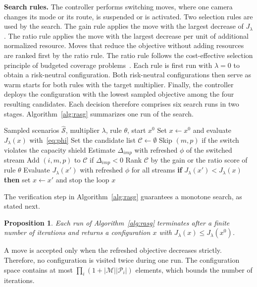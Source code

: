 \documentclass[letterpaper,journal]{IEEEtran}
\newtheorem{proposition}{Proposition}
\begin{document}
\textbf{Search rules.} The controller performs switching moves, where one camera changes its mode or its route, is suspended or is activated. Two selection rules are used by the search. The gain rule applies the move with the largest decrease of $J_\lambda$. The ratio rule applies the move with the largest decrease per unit of additional normalized resource. Moves that reduce the objective without adding resources are ranked first by the ratio rule. The ratio rule follows the cost-effective selection principle of budgeted coverage problems~\cite{khuller1999budgeted,leskovec2007cost}. Each rule is first run with $\lambda=0$ to obtain a risk-neutral configuration. Both risk-neutral configurations then serve as warm starts for both rules with the target multiplier. Finally, the controller deploys the configuration with the lowest sampled objective among the four resulting candidates. Each decision therefore comprises six search runs in two stages. Algorithm~\ref{alg:rasg} summarizes one run of the search.

\begin{algorithm}[t]
\caption{One search run of the RAS-G controller}
\label{alg:rasg}
\small
\begin{algorithmic}[1]
\Require Sampled scenarios $\hat{\mathcal S}$, multiplier $\lambda$, rule $\theta$, start $x^0$
\State Set $x\gets x^0$ and evaluate $J_\lambda(x)$ with~\eqref{eq:phi}
\Repeat
\State Set the candidate list $\mathcal C\gets\emptyset$
\State Skip $(m,p)$ if the switch violates the capacity shield
\State Estimate $\Delta_{imp}$ with refreshed $\phi$ of the switched stream
\State Add $(i,m,p)$ to $\mathcal C$ if $\Delta_{imp}<0$
\EndFor
\State Rank $\mathcal C$ by the gain or the ratio score of rule $\theta$
\State Evaluate $J_\lambda(x')$ with refreshed $\phi$ for all streams
\State \textbf{if} $J_\lambda(x')<J_\lambda(x)$ \textbf{then} set $x\gets x'$ and stop the loop
\EndFor
{}
\State \Return $x$
\end{algorithmic}
\end{algorithm}

The verification step in Algorithm~\ref{alg:rasg} guarantees a monotone search, as stated next.

\begin{proposition}\label{prop:term}
Each run of Algorithm~\ref{alg:rasg} terminates after a finite number of iterations and returns a configuration $x$ with $J_\lambda(x)\le J_\lambda(x^0)$.
\end{proposition}
\begin{IEEEproof}
A move is accepted only when the refreshed objective decreases strictly. Therefore, no configuration is visited twice during one run. The configuration space contains at most $\prod_i(1+|\mathcal M||\mathcal P_i|)$ elements, which bounds the number of iterations.
\end{IEEEproof}
\end{document}
